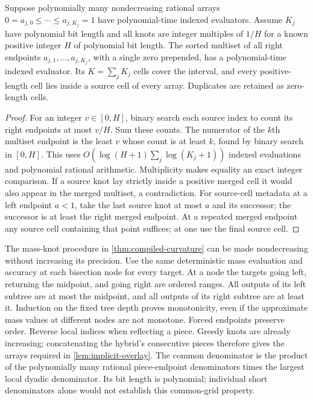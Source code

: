 \begin{lemma}\label{lem:implicit-overlay}
Suppose polynomially many nondecreasing rational arrays
$0=a_{j,0}\le\cdots\le a_{j,K_j}=1$ have polynomial-time indexed
evaluators. Assume $K_j$ have polynomial bit length and all knots are
integer multiples of $1/H$ for a known positive integer $H$ of polynomial
bit length. The sorted multiset of all right endpoints
$a_{j,1},\ldots,a_{j,K_j}$, with a single zero prepended, has a
polynomial-time indexed evaluator. Its $K=\sum_jK_j$ cells cover the
interval, and every positive-length cell lies inside a source cell
of every array. Duplicates are retained as zero-length cells.
\end{lemma}
\begin{proof}
For an integer $v\in[0,H]$, binary search each source index to count
its right endpoints at most $v/H$. Sum these counts. The numerator
of the $k$th multiset endpoint is the least $v$ whose count is at
least $k$, found by binary search in $[0,H]$. This uses
$O(\log(H+1)\sum_j\log(K_j+1))$ indexed evaluations and polynomial
rational arithmetic. Multiplicity makes equality an exact integer
comparison. If a source knot lay strictly inside a positive merged
cell it would also appear in the merged multiset, a contradiction.
For source-cell metadata at a left endpoint $a<1$, take the last source
knot at most $a$ and its successor; the successor is at least the right
merged endpoint. At a repeated merged endpoint any source cell
containing that point suffices; at one use the final source cell.
\end{proof}

The mass-knot procedure in \cref{thm:compiled-curvature} can be made
nondecreasing without increasing its precision. Use the same deterministic
mass evaluation and accuracy at each bisection node for every target.
At a node the targets going left, returning the midpoint, and going right
are ordered ranges. All outputs of its left subtree are at most the
midpoint, and all outputs of its right subtree are at least it. Induction
on the fixed tree depth proves monotonicity, even if the approximate mass
values at different nodes are not monotone. Forced endpoints preserve
order. Reverse local indices when reflecting a piece. Greedy knots are
already increasing; concatenating the hybrid's consecutive pieces
therefore gives the arrays required in \cref{lem:implicit-overlay}.
The common denominator is the product of the polynomially many rational
piece-endpoint denominators times the largest local dyadic denominator.
Its bit length is polynomial; individual short denominators alone would
not establish this common-grid property.


